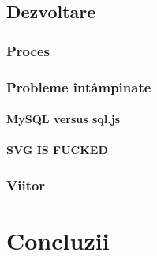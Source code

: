 \documentclass[12pt, a4paper, twoside, romanian]{teza-upb}
\begin{document}
  \section{Dezvoltare}

    \subsection{Proces}

    \subsection{Probleme întâmpinate}
      \subsubsection{MySQL versus sql.js} %
      \label{ssub:MySQL versus sql.js}

      \subsubsection{SVG IS FUCKED}

    \subsection{Viitor}
  \chapter{Concluzii}



\appendix
\end{document}
